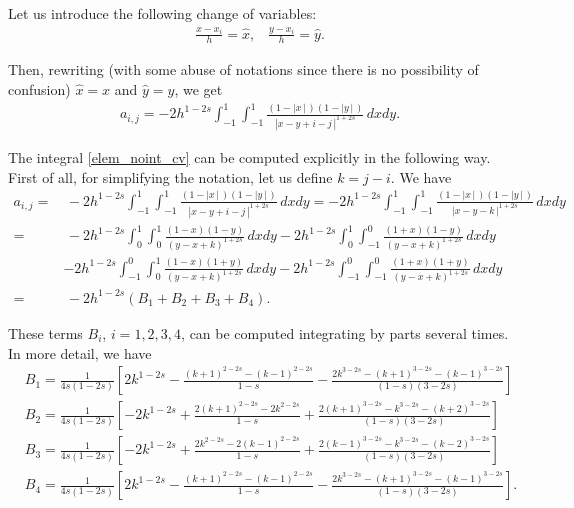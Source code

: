 {Let us introduce the following change of variables:
\begin{align}\label{cv_appendix}
	\frac{x-x_i}{h}=\hat{x},\;\;\; \frac{y-x_i}{h}=\hat{y}.
\end{align}

Then, rewriting (with some abuse of notations since there is no possibility of confusion) $\hat{x}=x$ and $\hat{y}=y$, we get 
\begin{align}\label{elem_noint_cv}
	a_{i,j}=-2h^{1-2s} \int_{-1}^1\int_{-1}^1\frac{(1-|x\,|\,)(1-|y\,|\,)}{|x-y+i-j\,|^{1+2s}}\,dxdy.
\end{align}

The integral \eqref{elem_noint_cv} can be computed explicitly in the following way. First of all, for simplifying the notation, let us define $k=j-i$. We have 
\begin{align*}
	a_{i,j} = &\, -2h^{1-2s} \int_{-1}^1\int_{-1}^1\frac{(1-|x\,|\,)(1-|y\,|\,)}{|x-y+i-j\,|^{1+2s}}\,dxdy =-2h^{1-2s} \int_{-1}^1\int_{-1}^1\frac{(1-|x\,|\,)(1-|y\,|\,)}{|x-y-k\,|^{1+2s}}\,dxdy
	\\
	= &\, -2h^{1-2s} \int_0^1\int_0^1\frac{(1-x)(1-y)}{(y-x+k)^{1+2s}}\,dxdy - 2h^{1-2s} \int_0^1\int_{-1}^0\frac{(1+x)(1-y)}{(y-x+k)^{1+2s}}\,dxdy 
	\\
	&- 2h^{1-2s} \int_{-1}^0\int_0^1\frac{(1-x)(1+y)}{(y-x+k)^{1+2s}}\,dxdy - 2h^{1-2s} \int_{-1}^0\int_{-1}^0\frac{(1+x)(1+y)}{(y-x+k)^{1+2s}}\,dxdy
	\\
	= &\, - 2h^{1-2s}(B_1 + B_2 + B_3 + B_4).
\end{align*}

These terms $B_i$, $i=1,2,3,4$, can be computed integrating by parts several times. In more detail, we have
\begin{align*}
	& B_1 = \frac{1}{4s(1-2s)}\left[2k^{1-2s}-\frac{(k+1)^{2-2s}-(k-1)^{2-2s}}{1-s}-\frac{2k^{3-2s}-(k+1)^{3-2s}-(k-1)^{3-2s}}{(1-s)(3-2s)}\right]
	\\
	& B_2 = \frac{1}{4s(1-2s)}\left[-2k^{1-2s}+\frac{2(k+1)^{2-2s}-2k^{2-2s}}{1-s}+\frac{2(k+1)^{3-2s}-k^{3-2s}-(k+2)^{3-2s}}{(1-s)(3-2s)}\right]
	\\
	& B_3 = \frac{1}{4s(1-2s)}\left[-2k^{1-2s}+\frac{2k^{2-2s}-2(k-1)^{2-2s}}{1-s}+\frac{2(k-1)^{3-2s}-k^{3-2s}-(k-2)^{3-2s}}{(1-s)(3-2s)}\right]
	\\
	& B_4 = \frac{1}{4s(1-2s)}\left[2k^{1-2s}-\frac{(k+1)^{2-2s}-(k-1)^{2-2s}}{1-s}-\frac{2k^{3-2s}-(k+1)^{3-2s}-(k-1)^{3-2s}}{(1-s)(3-2s)}\right].
\end{align*} 

}
